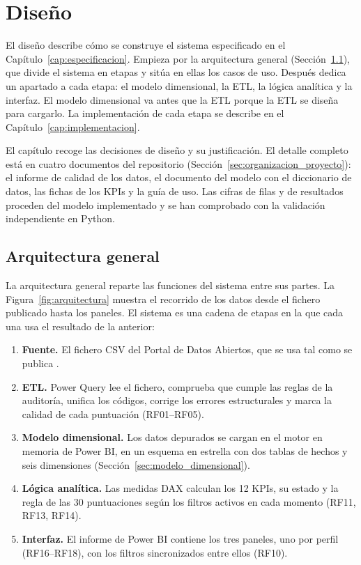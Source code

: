 \documentclass[12pt, a4paper, oneside]{report}
\begin{document}
\chapter{Diseño}
\label{cap:diseno}
El diseño describe cómo se construye el sistema especificado en el Capítulo~\ref{cap:especificacion}. Empieza por la arquitectura general (Sección~\ref{sec:arquitectura}), que divide el sistema en etapas y sitúa en ellas los casos de uso. Después dedica un apartado a cada etapa: el modelo dimensional, la ETL, la lógica analítica y la interfaz. El modelo dimensional va antes que la ETL porque la ETL se diseña para cargarlo. La implementación de cada etapa se describe en el Capítulo~\ref{cap:implementacion}.

El capítulo recoge las decisiones de diseño y su justificación. El detalle completo está en cuatro documentos del repositorio (Sección~\ref{sec:organizacion_proyecto}): el informe de calidad de los datos, el documento del modelo con el diccionario de datos, las fichas de los KPIs y la guía de uso. Las cifras de filas y de resultados proceden del modelo implementado y se han comprobado con la validación independiente en Python.

\section{Arquitectura general}
\label{sec:arquitectura}
La arquitectura general reparte las funciones del sistema entre sus partes. La Figura~\ref{fig:arquitectura} muestra el recorrido de los datos desde el fichero publicado hasta los paneles. El sistema es una cadena de etapas en la que cada una usa el resultado de la anterior:
\begin{enumerate}
    \item \textbf{Fuente.} El fichero CSV del Portal de Datos Abiertos, que se usa tal como se publica \cite{transparencia_catalunya_2024}.
    \item \textbf{ETL.} Power Query lee el fichero, comprueba que cumple las reglas de la auditoría, unifica los códigos, corrige los errores estructurales y marca la calidad de cada puntuación (RF01--RF05).
    \item \textbf{Modelo dimensional.} Los datos depurados se cargan en el motor en memoria de Power BI, en un esquema en estrella con dos tablas de hechos y seis dimensiones (Sección~\ref{sec:modelo_dimensional}).
    \item \textbf{Lógica analítica.} Las medidas DAX calculan los 12 KPIs, su estado y la regla de las 30 puntuaciones según los filtros activos en cada momento (RF11, RF13, RF14).
    \item \textbf{Interfaz.} El informe de Power BI contiene los tres paneles, uno por perfil (RF16--RF18), con los filtros sincronizados entre ellos (RF10).
\end{enumerate}
\end{document}
